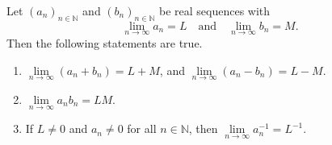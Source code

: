 \begin{theorem}
  Let $(a_n)_{n \in \mathbb{N}}$ and $(b_n)_{n \in \mathbb{N}}$ be real
  sequences with
  \begin{equation*}
    \lim_{n \to \infty} a_n = L
    \quad \text{and} \quad
    \lim_{n \to \infty} b_n = M.
  \end{equation*}
  Then the following statements are true.
  \begin{enumerate}
    \item $\lim\limits_{n \to \infty} (a_n + b_n) = L + M$, and
    $\lim\limits_{n \to \infty} (a_n - b_n) = L - M$.
    \item $\lim\limits_{n \to \infty} a_nb_n = LM$.
    \item If $L \neq 0$ and $a_n \neq 0$ for all $n \in \mathbb{N}$, then
    $\lim\limits_{n \to \infty} a_n^{-1} = L^{-1}$.
  \end{enumerate}
\end{theorem}
